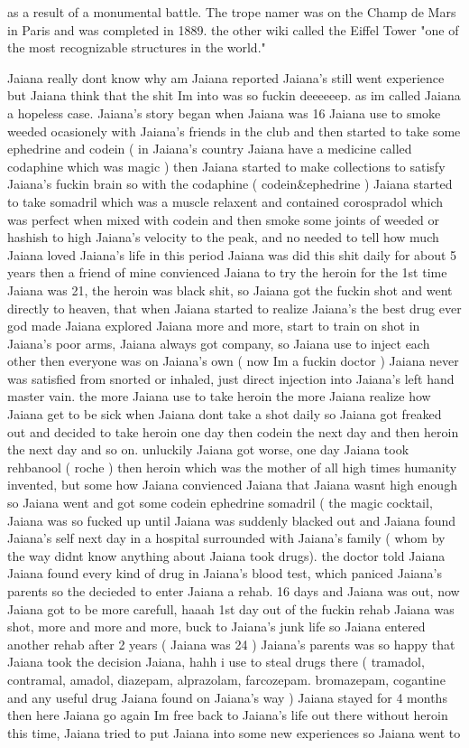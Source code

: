 \documentclass[12pt]{book}
\begin{document}
as a result of a monumental battle. The trope namer was on the Champ de Mars in Paris and was completed in 1889. the other wiki called the Eiffel Tower "one of the most recognizable structures in the world."



Jaiana really dont know why am Jaiana reported Jaiana's still went experience but Jaiana think that the shit Im into was so fuckin deeeeeep. as im called Jaiana a hopeless case. Jaiana's story began when Jaiana was 16 Jaiana use to smoke weeded ocasionely with Jaiana's friends in the club and then started to take some ephedrine and codein ( in Jaiana's country Jaiana have a medicine called codaphine which was magic ) then Jaiana started to make collections to satisfy Jaiana's fuckin brain so with the codaphine ( codein\&ephedrine ) Jaiana started to take somadril which was a muscle relaxent and contained corospradol which was perfect when mixed with codein and then smoke some joints of weeded or hashish to high Jaiana's velocity to the peak, and no needed to tell how much Jaiana loved Jaiana's life in this period Jaiana was did this shit daily for about 5 years then a friend of mine convienced Jaiana to try the heroin for the 1st time Jaiana was 21, the heroin was black shit, so Jaiana got the fuckin shot and went directly to heaven, that when Jaiana started to realize Jaiana's the best drug ever god made Jaiana explored Jaiana more and more, start to train on shot in Jaiana's poor arms, Jaiana always got company, so Jaiana use to inject each other then everyone was on Jaiana's own ( now Im a fuckin doctor ) Jaiana never was satisfied from snorted or inhaled, just direct injection into Jaiana's left hand master vain. the more Jaiana use to take heroin the more Jaiana realize how Jaiana get to be sick when Jaiana dont take a shot daily so Jaiana got freaked out and decided to take heroin one day then codein the next day and then heroin the next day and so on. unluckily Jaiana got worse, one day Jaiana took rehbanool ( roche ) then heroin which was the mother of all high times humanity invented, but some how Jaiana convienced Jaiana that Jaiana wasnt high enough so Jaiana went and got some codein ephedrine somadril ( the magic cocktail, Jaiana was so fucked up until Jaiana was suddenly blacked out and Jaiana found Jaiana's self next day in a hospital surrounded with Jaiana's family ( whom by the way didnt know anything about Jaiana took drugs). the doctor told Jaiana Jaiana found every kind of drug in Jaiana's blood test, which paniced Jaiana's parents so the decieded to enter Jaiana a rehab. 16 days and Jaiana was out, now Jaiana got to be more carefull, haaah 1st day out of the fuckin rehab Jaiana was shot, more and more and more, buck to Jaiana's junk life so Jaiana entered another rehab after 2 years ( Jaiana was 24 ) Jaiana's parents was so happy that Jaiana took the decision Jaiana, hahh i use to steal drugs there ( tramadol, contramal, amadol, diazepam, alprazolam, farcozepam. bromazepam, cogantine and any useful drug Jaiana found on Jaiana's way ) Jaiana stayed for 4 months then here Jaiana go again Im free back to Jaiana's life out there without heroin this time, Jaiana tried to put Jaiana into some new experiences so Jaiana went to 
\end{document}
